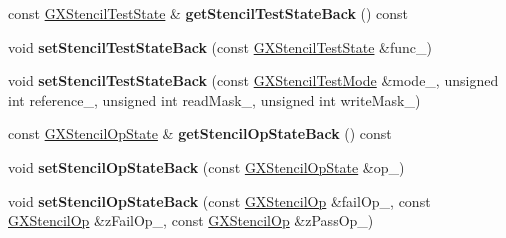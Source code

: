 \begin{DoxyCompactItemize}
\item 
const \hyperlink{class_i_dream_sky_1_1_g_x_stencil_test_state}{G\+X\+Stencil\+Test\+State} \& {\bfseries get\+Stencil\+Test\+State\+Back} () const \hypertarget{class_i_dream_sky_1_1_g_x_context_a81833fa15e72079a336f4491ed353517}{}\label{class_i_dream_sky_1_1_g_x_context_a81833fa15e72079a336f4491ed353517}

\item 
void {\bfseries set\+Stencil\+Test\+State\+Back} (const \hyperlink{class_i_dream_sky_1_1_g_x_stencil_test_state}{G\+X\+Stencil\+Test\+State} \&func\+\_\+)\hypertarget{class_i_dream_sky_1_1_g_x_context_ab9c4a810e98b112839d3a42a1bea266e}{}\label{class_i_dream_sky_1_1_g_x_context_ab9c4a810e98b112839d3a42a1bea266e}

\item 
void {\bfseries set\+Stencil\+Test\+State\+Back} (const \hyperlink{class_i_dream_sky_1_1_g_x_stencil_test_mode}{G\+X\+Stencil\+Test\+Mode} \&mode\+\_\+, unsigned int reference\+\_\+, unsigned int read\+Mask\+\_\+, unsigned int write\+Mask\+\_\+)\hypertarget{class_i_dream_sky_1_1_g_x_context_ae9ac9b24a994ae0817d5665ef6dc9c93}{}\label{class_i_dream_sky_1_1_g_x_context_ae9ac9b24a994ae0817d5665ef6dc9c93}

\item 
const \hyperlink{class_i_dream_sky_1_1_g_x_stencil_op_state}{G\+X\+Stencil\+Op\+State} \& {\bfseries get\+Stencil\+Op\+State\+Back} () const \hypertarget{class_i_dream_sky_1_1_g_x_context_a0f8b37fac4bd27fdd67437ea033b5b2d}{}\label{class_i_dream_sky_1_1_g_x_context_a0f8b37fac4bd27fdd67437ea033b5b2d}

\item 
void {\bfseries set\+Stencil\+Op\+State\+Back} (const \hyperlink{class_i_dream_sky_1_1_g_x_stencil_op_state}{G\+X\+Stencil\+Op\+State} \&op\+\_\+)\hypertarget{class_i_dream_sky_1_1_g_x_context_acb188378e32b7305d505bd1eb4df33d4}{}\label{class_i_dream_sky_1_1_g_x_context_acb188378e32b7305d505bd1eb4df33d4}

\item 
void {\bfseries set\+Stencil\+Op\+State\+Back} (const \hyperlink{class_i_dream_sky_1_1_g_x_stencil_op}{G\+X\+Stencil\+Op} \&fail\+Op\+\_\+, const \hyperlink{class_i_dream_sky_1_1_g_x_stencil_op}{G\+X\+Stencil\+Op} \&z\+Fail\+Op\+\_\+, const \hyperlink{class_i_dream_sky_1_1_g_x_stencil_op}{G\+X\+Stencil\+Op} \&z\+Pass\+Op\+\_\+)\hypertarget{class_i_dream_sky_1_1_g_x_context_affa09eb1b7fffd6feb54c9c3cb334d30}{}\label{class_i_dream_sky_1_1_g_x_context_affa09eb1b7fffd6feb54c9c3cb334d30}


\end{DoxyCompactItemize}
